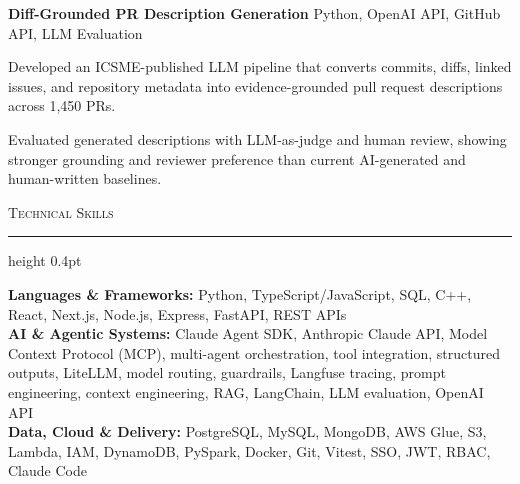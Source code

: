 \documentclass[letterpaper,11pt]{article}
\newcommand{\resumesection}[1]{%
  \par\vspace{2pt}%
  {\large\scshape #1}\par\vspace{2pt}%
  \hrule height 0.4pt\vspace{2pt}%
}
\newcommand{\projectHeading}[2]{
  \textbf{#1} \hfill #2
}
\begin{document}
\projectHeading{Diff-Grounded PR Description Generation}{Python, OpenAI API, GitHub API, LLM Evaluation}
\begin{tightitemize}
  \item Developed an ICSME-published LLM pipeline that converts commits, diffs, linked issues, and repository metadata into evidence-grounded pull request descriptions across 1,450 PRs.
  \item Evaluated generated descriptions with LLM-as-judge and human review, showing stronger grounding and reviewer preference than current AI-generated and human-written baselines.
\end{tightitemize}

\resumesection{Technical Skills}
\textbf{Languages \& Frameworks:} Python, TypeScript/JavaScript, SQL, C++, React, Next.js, Node.js, Express, FastAPI, REST APIs\\
\textbf{AI \& Agentic Systems:} Claude Agent SDK, Anthropic Claude API, Model Context Protocol (MCP), multi-agent orchestration, tool integration, structured outputs, LiteLLM, model routing, guardrails, Langfuse tracing, prompt engineering, context engineering, RAG, LangChain, LLM evaluation, OpenAI API\\
\textbf{Data, Cloud \& Delivery:} PostgreSQL, MySQL, MongoDB, AWS Glue, S3, Lambda, IAM, DynamoDB, PySpark, Docker, Git, Vitest, SSO, JWT, RBAC, Claude Code
\end{document}
